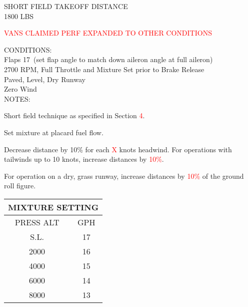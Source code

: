 \begin{sidewaysfigure}[t]
\begin{center}
\begin{perfhdr}SHORT FIELD TAKEOFF DISTANCE\\
1800 LBS
\end{perfhdr}
\Large
\textcolor{red}{VANS CLAIMED PERF EXPANDED TO OTHER CONDITIONS}\vspace{1ex}\\

\begin{minipage}{7.5in}
  \begin{flushleft}
    CONDITIONS:\\
    Flaps 17\textdegree \ (set flap angle to match down aileron angle at full aileron)\\
    2700 RPM, Full Throttle and Mixture Set prior to Brake Release\\
    Paved, Level, Dry Runway\\
    Zero Wind\\
\vspace{\perfnoteskip}
    NOTES:
    \begin{enumerate*}
      \item Short field technique as specified in Section \textcolor{red}{4}.
      \item Set mixture at placard fuel flow.
      \item Decrease distance by 10\% for each \textcolor{red}{X} knots headwind.  For operations with tailwinds up to 10
      knots, increase distances by \textcolor{red}{10\%}.
      \item For operation on a dry, grass runway, increase distances by \textcolor{red}{10\%} of the ground roll figure.
      \end{enumerate*}
    \end{flushleft}
  \end{minipage}
\hfill
\begin{minipage}{1.5in}
  \begin{tabular}{|c|c|}
    \hline
    \multicolumn{2}{|c|}{MIXTURE SETTING}\\
    \hline
    PRESS ALT&GPH\\
    \hline
    S.L.&17\\
    2000&16\\
    4000&15\\
    6000&14\\
    8000&13\\
    \hline
    \end{tabular}
  \end{minipage}
\\


\end{center}
\end{sidewaysfigure}
